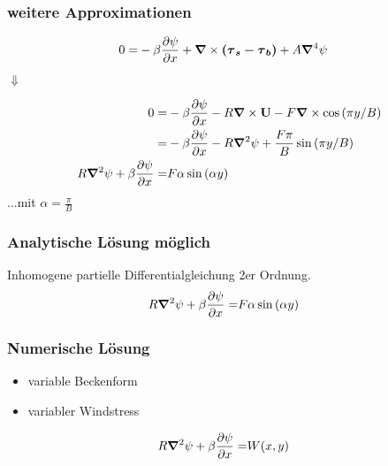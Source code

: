 \begin{frame}
\frametitle{weitere Approximationen}
\begin{align}
		0
	=& -\beta \frac{\partial\psi}{\partial x}  + \mathbf{\bm{\nabla}} \times \mathbf{\bm{\left( \mathbf{\tau}_{s}- \mathbf{\tau}_{b} \right)}}  + A  \mathbf{\bm{\nabla}}^{4} \psi \nonumber  
\end{align}
\begin{center}
	$\Downarrow$
\end{center}
\begin{align}
		0
	=& -\beta \frac{\partial\psi}{\partial x}  - R \mathbf{\bm{\nabla}} \times \mathbf{\bm{U}} - F \mathbf{\bm{\nabla}} \times  \cos{(\pi y / B)} \nonumber   \\
	=& -\beta \frac{\partial\psi}{\partial x}  - R \mathbf{\bm{\nabla}}^2 \psi + \frac{F\pi}{B} \sin{(\pi y / B)}\nonumber  \\
R \mathbf{\bm{\nabla}}^2 \psi+\beta \frac{\partial\psi}{\partial x}   
	=&
	 F\alpha \sin{(\alpha y )}
\end{align}
...mit $ \alpha	= \frac{\pi}{B} $
\end{frame}

\begin{frame}
\frametitle{Analytische Lösung möglich}
Inhomogene partielle Differentialgleichung 2er Ordnung.
\begin{align}
    R \mathbf{\bm{\nabla}}^2 \psi+\beta \frac{\partial\psi}{\partial x}   
	=&
	 F\alpha \sin{(\alpha y )}\nonumber 
\end{align}
\end{frame}

\begin{frame}
\frametitle{Numerische Lösung}
\begin{itemize}
	\item
	variable Beckenform
	\item
	variabler Windstress
\end{itemize}
\begin{align}
    R \mathbf{\bm{\nabla}}^2 \psi+\beta \frac{\partial\psi}{\partial x}   
	=&
	 W(x,y)
\end{align}
\end{frame}

